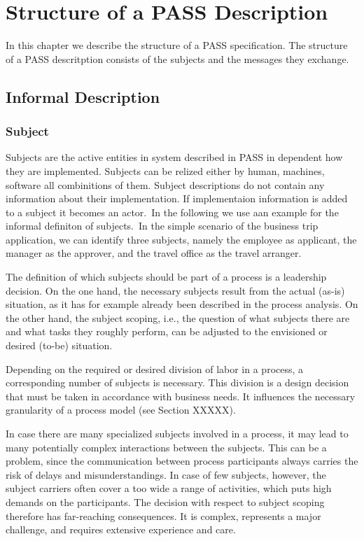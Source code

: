 \chapter{Structure of a PASS Description}
	In this chapter we describe the structure of a PASS specification. The structure of a PASS descritption consists of the subjects and the messages they exchange.

\section{Informal Description}
\subsection{Subject}

Subjects are the active entities in system described in PASS in dependent how they are implemented. Subjects can be relized either by human, machines, software all combinitions of them. Subject descriptions do not contain any information about their implementation. If implementaion information is added to a subject it becomes an actor.\
In the following we use aan example for the informal definiton of subjects.\
In the simple scenario of the business trip application, we can identify three subjects, namely the employee as applicant, the manager as the approver, and the travel office as the travel arranger.

The definition of which subjects should be part of a process is a leadership decision. On the one hand, the necessary subjects result from the actual (as-is) situation, as it has for example already been described in the process analysis. On the other hand, the subject scoping, i.e., the question of what subjects there are and what tasks they roughly perform, can be adjusted to the envisioned or desired (to-be) situation.

Depending on the required or desired division of labor in a process, a corresponding number of subjects is necessary. This division is a design decision that must be taken in accordance with business needs. It influences the necessary granularity of a process model (see Section XXXXX).

In case there are many specialized subjects involved in a process, it may lead to many potentially complex interactions between the subjects. This can be a problem, since the communication between process participants always carries the risk of delays and misunderstandings. In case of few subjects, however, the subject carriers often cover a too wide a range of activities, which puts high demands on the participants. The decision with respect to subject scoping therefore has far-reaching consequences. It is complex, represents a major challenge, and requires extensive experience and care.

